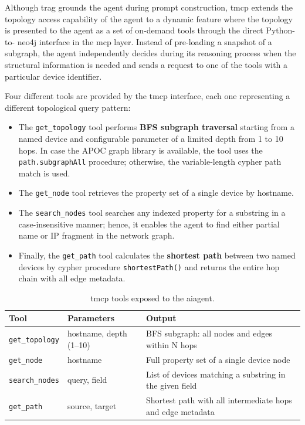 \documentclass[11pt,a4paper]{report}
\begin{document}
Although  \gls{trag}  grounds the agent during prompt construction,  \gls{tmcp}  extends the topology access capability of the agent to a dynamic feature where the topology is presented to the agent as a set of on-demand tools through the direct Python-to- \gls{neo4j}  interface in the \gls{mcp}  layer. Instead of pre-loading a snapshot of a subgraph, the agent independently decides during its reasoning process when the structural information is needed and sends a request to one of the tools with a particular device identifier.


Four different tools are provided by the  \gls{tmcp}  interface, each one representing a different topological query pattern:

\begin{itemize}
    \item The \texttt{get\_topology} tool performs \textbf{BFS subgraph traversal} starting from a named device and configurable parameter of a limited depth from 1 to 10 hops. In case the APOC graph library is available, the tool uses the \texttt{path.subgraphAll} procedure; otherwise, the variable-length  \gls{cypher}  path match is used.
    \item The \texttt{get\_node} tool retrieves the property set of a single device by hostname.
    \item The \texttt{search\_nodes} tool searches any indexed property for a substring in a case-insensitive manner; hence, it enables the agent to find either partial name or IP fragment in the network graph.
    \item Finally, the \texttt{get\_path} tool calculates the \textbf{shortest path} between two named devices by  \gls{cypher}  procedure \texttt{shortestPath()} and returns the entire hop chain with all edge metadata.
\end{itemize}


\begin{table}[H]
\centering
\caption{ \gls{tmcp}  tools exposed to the \gls{ai}agent.}
\label{tab:tmcp-tools}
\small
\begin{tabular}{p{3cm} p{3.5cm} p{6cm}}
\toprule
\textbf{Tool} & \textbf{Parameters} & \textbf{Output} \\
\midrule
\texttt{get\_topology} & hostname, depth (1--10) & 
BFS subgraph: all nodes and edges within N hops \\[4pt]
\texttt{get\_node} & hostname & 
Full property set of a single device node \\[4pt]
\texttt{search\_nodes} & query, field & 
List of devices matching a substring in the given field \\[4pt]
\texttt{get\_path} & source, target & 
Shortest path with all intermediate hops and edge metadata \\
\bottomrule
\end{tabular}
\end{table}
\end{document}
